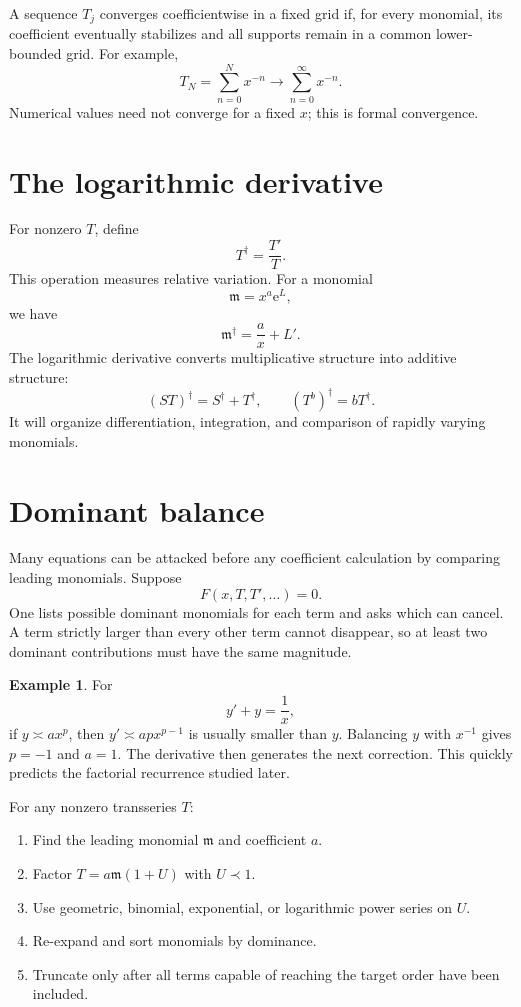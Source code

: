 \documentclass[11pt,oneside]{book}
\theoremstyle{definition}
\newtheorem{example}[theorem]{Example}
\theoremstyle{remark}
\newcommand{\m}{\mathfrak{m}}
\newcommand{\e}{\mathrm{e}}
\newcommand{\precdom}{\prec}
\begin{document}
A sequence $T_j$ converges coefficientwise in a fixed grid if, for every
monomial, its coefficient eventually stabilizes and all supports remain in a
common lower-bounded grid. For example,
\[
  T_N=\sum_{n=0}^{N}x^{-n}
  \longrightarrow
  \sum_{n=0}^{\infty}x^{-n}.
\]
Numerical values need not converge for a fixed $x$; this is formal convergence.

\section{The logarithmic derivative}

For nonzero $T$, define
\[
  T^\dagger=\frac{T'}{T}.
\]
This operation measures relative variation. For a monomial
\[
  \m=x^a\e^L,
\]
we have
\begin{equation}
  \m^\dagger=\frac{a}{x}+L'.
  \label{eq:monomial-log-derivative}
\end{equation}
The logarithmic derivative converts multiplicative structure into additive
structure:
\[
  (ST)^\dagger=S^\dagger+T^\dagger,
  \qquad
  (T^b)^\dagger=bT^\dagger.
\]
It will organize differentiation, integration, and comparison of rapidly
varying monomials.

\section{Dominant balance}

Many equations can be attacked before any coefficient calculation by comparing
leading monomials. Suppose
\[
  F(x,T,T',\ldots)=0.
\]
One lists possible dominant monomials for each term and asks which can cancel.
A term strictly larger than every other term cannot disappear, so at least two
dominant contributions must have the same magnitude.

\begin{example}
For
\[
  y'+y=\frac1x,
\]
if $y\asymp a x^p$, then $y'\asymp apx^{p-1}$ is usually smaller than $y$.
Balancing $y$ with $x^{-1}$ gives $p=-1$ and $a=1$. The derivative then
generates the next correction. This quickly predicts the factorial recurrence
studied later.
\end{example}

\begin{recipebox}[title=Normal-form workflow]
For any nonzero transseries $T$:
\begin{enumerate}
\item Find the leading monomial $\m$ and coefficient $a$.
\item Factor $T=a\m(1+U)$ with $U\precdom1$.
\item Use geometric, binomial, exponential, or logarithmic power series on $U$.
\item Re-expand and sort monomials by dominance.
\item Truncate only after all terms capable of reaching the target order have
      been included.
\end{enumerate}
\end{recipebox}
\end{document}
